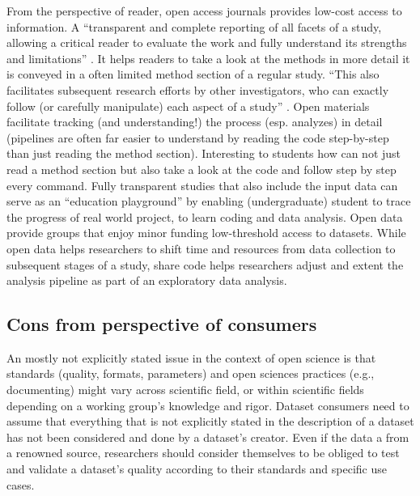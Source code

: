 %
From the perspective of reader, open access journals provides low-cost access to
information.
A ``transparent and complete reporting of all facets of a study, allowing a
critical reader to evaluate the work and fully understand its strengths and
limitations'' \citep{nichols2017best}.
%
It helps readers to take a look at the methods in more detail it is conveyed in
a often limited method section of a regular study.
%
``This also facilitates subsequent research efforts by other investigators, who
can exactly follow (or carefully manipulate) each aspect of a study''
\citep{nichols2017best}.
%
Open materials facilitate tracking (and understanding!) the process (esp.
analyzes) in detail (pipelines are often far easier to understand by reading the
code step-by-step than just reading the method section).
%
Interesting to students how can not just read a method section but also take a
look at the code and follow step by step every command.
%
Fully transparent studies that also include the input data can serve as an
``education playground'' by enabling (undergraduate) student to trace the
progress of real world project, to learn coding and data analysis.
%
Open data provide groups that enjoy minor funding low-threshold access to
datasets.
%
While open data helps researchers to shift time and resources from data
collection to subsequent stages of a study, share code helps researchers adjust
and extent the analysis pipeline as part of an exploratory data analysis.


\subsection{Cons from perspective of consumers}

An mostly not explicitly stated issue in the context of open science is that
standards (quality, formats, parameters) and open sciences practices (e.g.,
documenting) might vary across scientific field, or within scientific fields
depending on a working group's knowledge and rigor.
Dataset consumers need to assume that everything that is not explicitly stated
in the description of a dataset has not been considered and done by a dataset's
creator.
Even if the data a from a renowned source, researchers should consider
themselves to be obliged to test and validate a dataset's quality according to
their standards and specific use cases.


